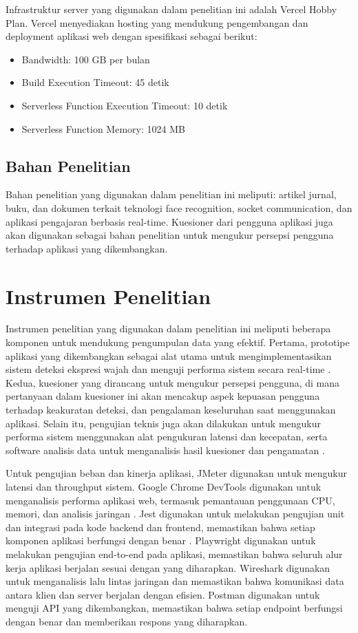 \hspace{-32pt} Infrastruktur server yang digunakan dalam penelitian ini adalah Vercel Hobby Plan. Vercel menyediakan hosting yang mendukung pengembangan dan deployment aplikasi web dengan spesifikasi sebagai berikut:
\begin{itemize}
  \item Bandwidth: 100 GB per bulan
  \item Build Execution Timeout: 45 detik
  \item Serverless Function Execution Timeout: 10 detik
  \item Serverless Function Memory: 1024 MB
\end{itemize}

\subsection{Bahan Penelitian}
Bahan penelitian yang digunakan dalam penelitian ini meliputi: artikel jurnal, buku, dan dokumen terkait teknologi face recognition, socket communication, dan aplikasi pengajaran berbasis real-time.
Kuesioner dari pengguna aplikasi juga akan digunakan sebagai bahan penelitian untuk mengukur persepsi pengguna terhadap aplikasi yang dikembangkan.

\section{Instrumen Penelitian}
Instrumen penelitian yang digunakan dalam penelitian ini meliputi beberapa komponen untuk mendukung pengumpulan data yang efektif.
Pertama, prototipe aplikasi yang dikembangkan sebagai alat utama untuk mengimplementasikan sistem deteksi ekspresi wajah dan menguji performa sistem secara real-time \parencite{archanaRealTimeFace2022}.
Kedua, kuesioner yang dirancang untuk mengukur persepsi pengguna, di mana pertanyaan dalam kuesioner ini akan mencakup aspek kepuasan pengguna terhadap keakuratan deteksi, dan pengalaman keseluruhan saat menggunakan aplikasi.
Selain itu, pengujian teknis juga akan dilakukan untuk mengukur performa sistem menggunakan alat pengukuran latensi dan kecepatan, serta software analisis data untuk menganalisis hasil kuesioner dan pengamatan \parencite{budimanWebPerformanceOptimization2019}.

Untuk pengujian beban dan kinerja aplikasi, JMeter digunakan untuk mengukur latensi dan throughput sistem. Google Chrome DevTools digunakan untuk menganalisis performa aplikasi web, termasuk pemantauan penggunaan CPU, memori, dan analisis jaringan \parencite{jinImpactExtensionsBrowser2024}. Jest digunakan untuk melakukan pengujian unit dan integrasi pada kode backend dan frontend, memastikan bahwa setiap komponen aplikasi berfungsi dengan benar \parencite{bykovWebApplicationDevelopment2020}. Playwright digunakan untuk melakukan pengujian end-to-end pada aplikasi, memastikan bahwa seluruh alur kerja aplikasi berjalan sesuai dengan yang diharapkan. Wireshark digunakan untuk menganalisis lalu lintas jaringan dan memastikan bahwa komunikasi data antara klien dan server berjalan dengan efisien. Postman digunakan untuk menguji API yang dikembangkan, memastikan bahwa setiap endpoint berfungsi dengan benar dan memberikan respons yang diharapkan.

